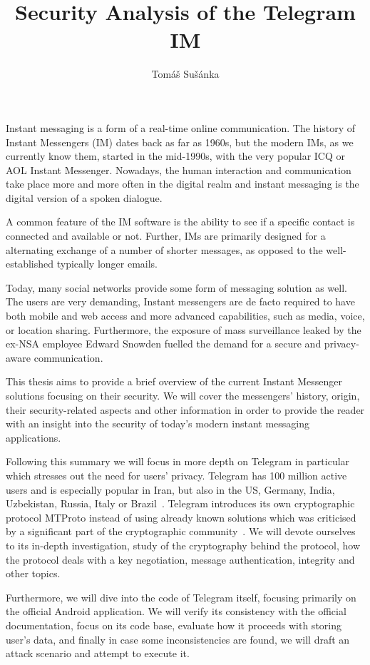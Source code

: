 \documentclass[thesis=M,english]{FITthesis}[2012/10/20]
\title{Security Analysis of the Telegram IM}
\author{Tom{\' a}{\v s} Su{\v s}{\' a}nka} %
\begin{document}
\begin{introduction}

Instant messaging is a form of a real-time online communication. The history of Instant Messengers (IM) dates back as far as 1960s, but the modern IMs, as we currently know them, started in the mid-1990s, with the very popular ICQ or AOL Instant Messenger. Nowadays, the human interaction and communication take place more and more often in the digital realm and instant messaging is the digital version of a spoken dialogue.

A common feature of the IM software is the ability to see if a specific contact is connected and available or not. Further, IMs are primarily designed for a alternating exchange of a number of shorter messages, as opposed to the well-established typically longer emails.

Today, many social networks provide some form of messaging solution as well. The users are very demanding, Instant messengers are de facto required to have both mobile and web access and more advanced capabilities, such as media, voice, or location sharing. Furthermore, the exposure of mass surveillance leaked by the ex-NSA employee Edward Snowden fuelled the demand for a secure and privacy-aware communication.

This thesis aims to provide a brief overview of the current Instant Messenger solutions focusing on their security. We will cover the messengers' history, origin, their security-related aspects and other information in order to provide the reader with an insight into the security of today's modern instant messaging applications.

Following this summary we will focus in more depth on Telegram in particular which stresses out the need for users' privacy. Telegram has 100 million active users and is especially popular in Iran, but also in the US, Germany, India, Uzbekistan, Russia, Italy or Brazil~\cite{telegram-countries}. Telegram introduces its own cryptographic protocol MTProto instead of using already known solutions which was criticised by a significant part of the cryptographic community~\cite{telegram-community-vice,telegram-community-register}. We will devote ourselves to its in-depth investigation, study of the cryptography behind the protocol, how the protocol deals with a key negotiation, message authentication, integrity and other topics.

Furthermore, we will dive into the code of Telegram itself, focusing primarily on the official Android application. We will verify its consistency with the official documentation, focus on its code base, evaluate how it proceeds with storing user's data, and finally in case some inconsistencies are found, we will draft an attack scenario and attempt to execute it.

\end{introduction}
\end{document}
